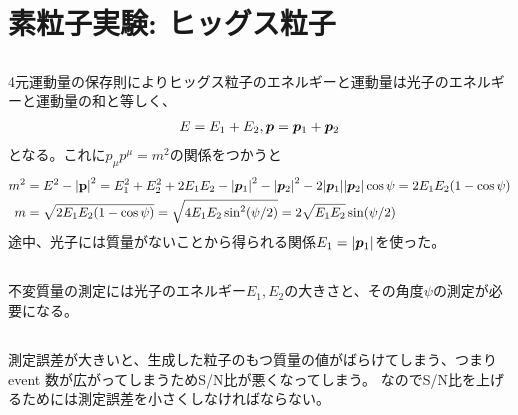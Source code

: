 \documentclass[../../sp_2013.tex]{subfiles}
\begin{document}
\section{素粒子実験: ヒッグス粒子}
\subsection{}
4元運動量の保存則によりヒッグス粒子のエネルギーと運動量は光子のエネルギーと運動量の和と等しく、
\begin{equation}\begin{aligned}[b]
    E =E_1+E_2, \vb*{p}=\vb*{p}_1+\vb*{p}_2
\end{aligned}\end{equation}
となる。これに\(p_\mu p^\mu=m^2\)の関係をつかうと
\begin{equation}\begin{aligned}[b]
    m^2 &= E^2 -\abs{\vb{p}}^2
    = E_1^2+E_2^2+2E_1E_2 - \abs{\vb*{p}_1}^2 - \abs{\vb*{p}_2}^2 - 2\abs{\vb*{p}_1}\abs{\vb*{p}_2}\cos\psi
    = 2E_1E_2(1-\cos\psi)\\
    m &= \sqrt{2E_1E_2(1-\cos\psi)}=\sqrt{4E_1E_2\sin^2(\psi/2)} = 2\sqrt{E_1E_2}\sin(\psi/2)
\end{aligned}\end{equation}
途中、光子には質量がないことから得られる関係\(E_1=\abs{\vb*{p}_1}\)を使った。

\subsection{}
不変質量の測定には光子のエネルギー\(E_1,E_2\)の大きさと、その角度\(\psi\)の測定が必要になる。
\subsection{}
測定誤差が大きいと、生成した粒子のもつ質量の値がばらけてしまう、つまり event 数が広がってしまうためS/N比が悪くなってしまう。
なのでS/N比を上げるためには測定誤差を小さくしなければならない。
\end{document}
